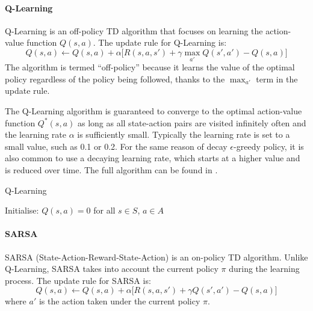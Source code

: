  \paragraph*{Q-Learning}

 Q-Learning is an off-policy TD algorithm that focuses on learning the action-value function \(Q(s, a)\). The update rule for Q-Learning is:
 \begin{equation}
 Q(s, a) \leftarrow Q(s, a) + \alpha \Big[ R(s, a, s') + \gamma \max_{a'} Q(s', a') - Q(s, a) \Big]
 \end{equation}
 The algorithm is termed ``off-policy'' because it learns the value of the optimal policy regardless of the policy being followed, 
  thanks to the \(\max_{a'}\) term in the update rule.
 
The Q-Learning algorithm is guaranteed to converge to the optimal action-value function \(Q^*(s, a)\) as long as all state-action pairs are visited infinitely often and the learning rate \(\alpha\) is sufficiently small.
%
Typically the learning rate is set to a small value, such as 0.1 or 0.2. 
% 
For the same reason of decay \(\epsilon\)-greedy policy,
  it is also common to use a decaying learning rate, 
  which starts at a higher value and is reduced over time.
The full algorithm can be found in .
\begin{algorithm}
\DontPrintSemicolon
\caption{Q-Learning}\label{alg:q-learning}
Initialise: $Q(s, a) = 0$ for all $s \in S$, $a \in A$\;
\end{algorithm}

 \paragraph*{SARSA}
 SARSA (State-Action-Reward-State-Action) is an on-policy TD algorithm. 
  Unlike Q-Learning, SARSA takes into account the current policy \(\pi\) during the learning process. The update rule for SARSA is:
 \begin{equation}
 Q(s, a) \leftarrow Q(s, a) + \alpha \Big[ R(s, a, s') + \gamma Q(s', a') - Q(s, a) \Big]
 \end{equation}
 where \(a'\) is the action taken under the current policy \(\pi\).
 
